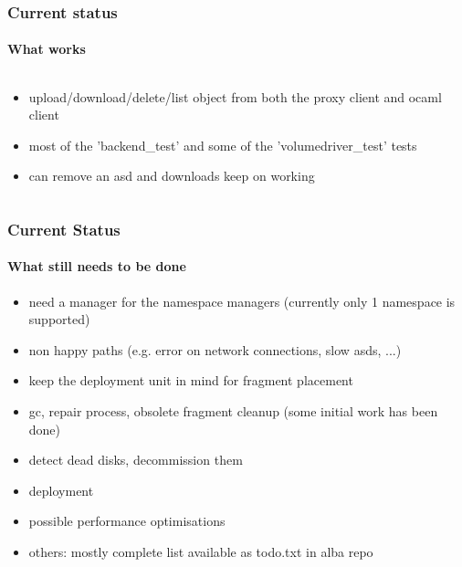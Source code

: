 \documentclass{beamer}
\begin{document}
\begin{frame}
  \frametitle{Current status}
  \framesubtitle{ What works }
  \begin{columns}[T]
    \begin{column}[T]{10cm}

      \begin{itemize}
      \item upload/download/delete/list object
        from both the proxy client and ocaml client
      \item most of the 'backend\_test' and some of the 'volumedriver\_test' tests
      \item can remove an asd and downloads keep on working
      \end{itemize}


    \end{column}
  \end{columns}
\end{frame}

\begin{frame}
  \frametitle{Current Status}
  \framesubtitle{ What still needs to be done }
  \begin{itemize}
    \item need a manager for the namespace managers
      (currently only 1 namespace is supported)
    \item non happy paths (e.g. error on network connections, slow asds, ...)
    \item keep the deployment unit in mind for fragment placement
    \item gc, repair process, obsolete fragment cleanup (some initial work has been done)
    \item detect dead disks, decommission them
    \item deployment
    \item possible performance optimisations
    \item others: mostly complete list available as todo.txt in alba repo
  \end{itemize}
\end{frame}
\end{document}
